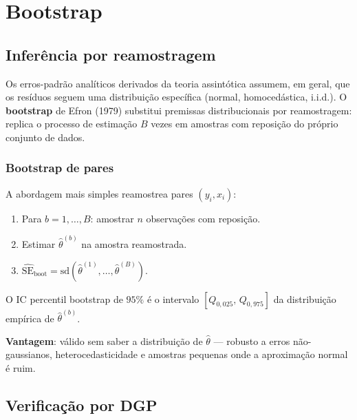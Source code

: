 \chapter{Bootstrap}
\label{cap:bootstrap}

\section{Inferência por reamostragem}

Os erros-padrão analíticos derivados da teoria assintótica assumem, em geral,
que os resíduos seguem uma distribuição específica (normal, homocedástica,
i.i.d.). O \textbf{bootstrap} de Efron (1979) substitui premissas
distribucionais por reamostragem: replica o processo de estimação $B$ vezes
em amostras com reposição do próprio conjunto de dados.

\subsection*{Bootstrap de pares}

A abordagem mais simples reamostrea pares $(y_i, x_i)$:

\begin{enumerate}
  \item Para $b = 1,\ldots,B$: amostrar $n$ observações com reposição.
  \item Estimar $\hat\theta^{(b)}$ na amostra reamostrada.
  \item $\widehat{\mathrm{SE}}_{\mathrm{boot}} = \mathrm{sd}(\hat\theta^{(1)},\ldots,\hat\theta^{(B)})$.
\end{enumerate}

O IC percentil bootstrap de $95\%$ é o intervalo $[Q_{0{,}025},\, Q_{0{,}975}]$
da distribuição empírica de $\hat\theta^{(b)}$.

\textbf{Vantagem}: válido sem saber a distribuição de $\hat\theta$ — robusto
a erros não-gaussianos, heterocedasticidade e amostras pequenas onde a
aproximação normal é ruim.

\section{Verificação por DGP}

